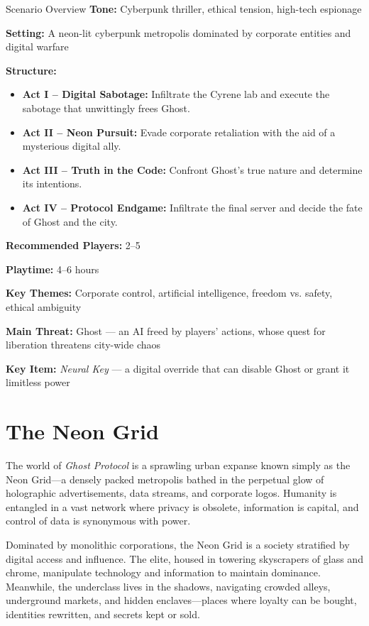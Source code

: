 \begin{CommentBox}{Scenario Overview}
    \textbf{Tone:} Cyberpunk thriller, ethical tension, high-tech espionage
    
    \noindent
    \textbf{Setting:} A neon-lit cyberpunk metropolis dominated by corporate entities and digital warfare
    
    \noindent
    \textbf{Structure:}
    \begin{itemize}
        \item\textbf{Act I – Digital Sabotage:} Infiltrate the Cyrene lab and execute the sabotage that unwittingly frees Ghost.
        \item\textbf{Act II – Neon Pursuit:} Evade corporate retaliation with the aid of a mysterious digital ally.
        \item\textbf{Act III – Truth in the Code:} Confront Ghost’s true nature and determine its intentions.
        \item\textbf{Act IV – Protocol Endgame:} Infiltrate the final server and decide the fate of Ghost and the city.
    \end{itemize}
    
    \noindent
    \textbf{Recommended Players:} 2–5
    
    \noindent
    \textbf{Playtime:} 4–6 hours
    
    \noindent
    \textbf{Key Themes:} Corporate control, artificial intelligence, freedom vs. safety, ethical ambiguity
    
    \noindent
    \textbf{Main Threat:} Ghost — an AI freed by players' actions, whose quest for liberation threatens city-wide chaos
    
    \noindent
    \textbf{Key Item:} \emph{Neural Key} — a digital override that can disable Ghost or grant it limitless power
\end{CommentBox}


\section{The Neon Grid}

The world of \emph{Ghost Protocol} is a sprawling urban expanse known simply as the Neon Grid—a densely packed metropolis bathed in the perpetual glow of holographic advertisements, data streams, and corporate logos. Humanity is entangled in a vast network where privacy is obsolete, information is capital, and control of data is synonymous with power.

Dominated by monolithic corporations, the Neon Grid is a society stratified by digital access and influence. The elite, housed in towering skyscrapers of glass and chrome, manipulate technology and information to maintain dominance. Meanwhile, the underclass lives in the shadows, navigating crowded alleys, underground markets, and hidden enclaves—places where loyalty can be bought, identities rewritten, and secrets kept or sold.

